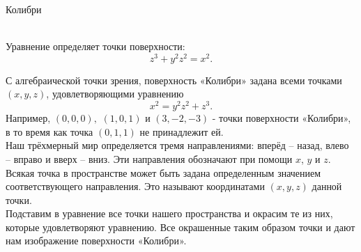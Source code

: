 \documentclass[ru]{./../../common/SurferDesc}%
\begin{document}
\footnotesize

\begin{surferPage}
  \begin{surferTitle}Колибри\end{surferTitle}   \\
Уравнение определяет точки поверхности:\\
  
  \smallskip
\[z^3+ y^2	z^2	= x^2.\]

\singlespacing
С алгебраической точки зрения, поверхность «Колибри» задана всеми точками $(x, y, z)$, удовлетворяющими уравнению
\smallskip
\[ x^2= y^2z^2+z^3.\]
\smallskip
Например, $(0,0,0),$ $(1,0,1)$ и $(3,-2,-3)$  - точки поверхности «Колибри», в то время как точка $(0,1,1)$ не принадлежит ей.\\
 \singlespacing
Наш трёхмерный мир определяется тремя направлениями: вперёд – назад, влево – вправо и вверх – вниз. Эти направления обозначают при помощи $x$, $y$ и $z$. Всякая точка в пространстве может быть задана определенным значением соответствующего направления. Это называют координатами $(x,y,z)$ данной точки. \\
\singlespacing
Подставим в уравнение все точки нашего пространства и окрасим те из них, которые удовлетворяют уравнению. Все окрашенные таким образом точки и дают нам изображение поверхности «Колибри».\\
\singlespacing


  \begin{surferText}
     \end{surferText}
\end{surferPage}
\end{document}
